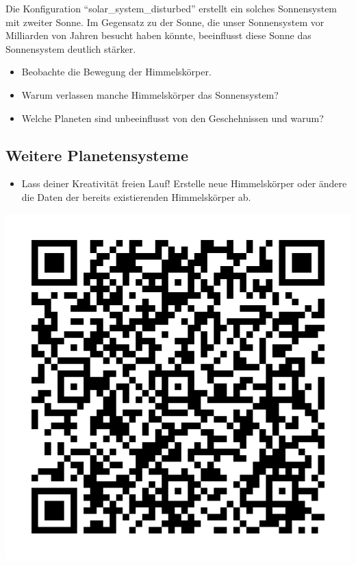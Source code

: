 \documentclass{scrartcl}
\begin{document}
        Die Konfiguration "`solar\_system\_disturbed"' erstellt ein solches Sonnensystem mit zweiter Sonne.
        Im Gegensatz zu der Sonne, die unser Sonnensystem vor Milliarden von Jahren besucht haben könnte, beeinflusst diese Sonne das Sonnensystem deutlich stärker.
        \begin{itemize}
            \item Beobachte die Bewegung der Himmelskörper.
            \item Warum verlassen manche Himmelskörper das Sonnensystem?
            \item Welche Planeten sind unbeeinflusst von den Geschehnissen und warum?
        \end{itemize}

        \subsection*{Weitere Planetensysteme}
        \begin{itemize}
        \item Lass deiner Kreativität freien Lauf! Erstelle neue Himmelskörper oder ändere die Daten der bereits existierenden Himmelskörper ab.
        \end{itemize}
        \vfill\hfill
        \includegraphics[width=.2\textwidth]{qr.png}
\end{document}
